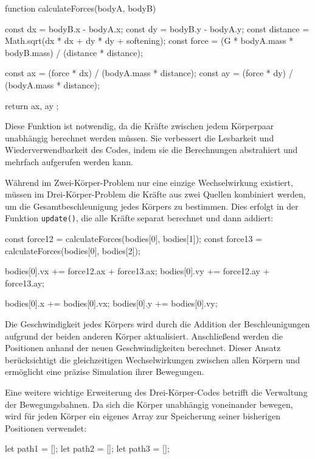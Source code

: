\documentclass[a4paper,12pt,twoside]{article}
\begin{document}
\begin{javascript}
function calculateForces(bodyA, bodyB) {
    const dx = bodyB.x - bodyA.x;
    const dy = bodyB.y - bodyA.y;
    const distance = Math.sqrt(dx * dx + dy * dy + softening);
    const force = (G * bodyA.mass * bodyB.mass) / (distance * distance);

    const ax = (force * dx) / (bodyA.mass * distance);
    const ay = (force * dy) / (bodyA.mass * distance);

    return { ax, ay };
}
\end{javascript}

Diese Funktion ist notwendig, da die Kräfte zwischen jedem Körperpaar unabhängig berechnet werden müssen. Sie verbessert die Lesbarkeit und Wiederverwendbarkeit des Codes, indem sie die Berechnungen abstrahiert und mehrfach aufgerufen werden kann.

Während im Zwei-Körper-Problem nur eine einzige Wechselwirkung existiert, müssen im Drei-Körper-Problem die Kräfte aus zwei Quellen kombiniert werden, um die Gesamtbeschleunigung jedes Körpers zu bestimmen. Dies erfolgt in der Funktion \texttt{update()}, die alle Kräfte separat berechnet und dann addiert:

\begin{javascript}
const force12 = calculateForces(bodies[0], bodies[1]);
const force13 = calculateForces(bodies[0], bodies[2]);

bodies[0].vx += force12.ax + force13.ax;
bodies[0].vy += force12.ay + force13.ay;

bodies[0].x += bodies[0].vx;
bodies[0].y += bodies[0].vy;
\end{javascript}

Die Geschwindigkeit jedes Körpers wird durch die Addition der Beschleunigungen aufgrund der beiden anderen Körper aktualisiert. Anschließend werden die Positionen anhand der neuen Geschwindigkeiten berechnet. Dieser Ansatz berücksichtigt die gleichzeitigen Wechselwirkungen zwischen allen Körpern und ermöglicht eine präzise Simulation ihrer Bewegungen.

Eine weitere wichtige Erweiterung des Drei-Körper-Codes betrifft die Verwaltung der Bewegungsbahnen. Da sich die Körper unabhängig voneinander bewegen, wird für jeden Körper ein eigenes Array zur Speicherung seiner bisherigen Positionen verwendet:

\begin{javascript}
let path1 = [];
let path2 = [];
let path3 = [];
\end{javascript}
\end{document}
